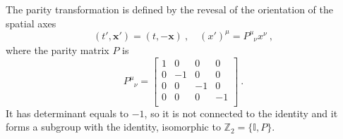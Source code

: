     The parity transformation is defined by the revesal of the orientation of the spatial axes
    \begin{equation*}
        (t', \mathbf x') = (t, - \mathbf x) ~, \quad (x')^\mu = P^\mu_{\phantom \mu \nu} x^\nu ~,
    \end{equation*}
    where the parity matrix $P$ is 
    \begin{equation*}
        P^\mu_{\phantom \mu \nu} = \begin{bmatrix}
            1 & 0 & 0 & 0 \\
            0 & -1 & 0 & 0 \\
            0 & 0 & -1 & 0 \\
            0 & 0 & 0 & -1 \\
        \end{bmatrix} ~.
    \end{equation*}
    It has determinant equals to $-1$, so it is not connected to the identity and it forms a subgroup with the identity, isomorphic to $\mathbb Z_2 = \{\mathbb I, P\}$.

